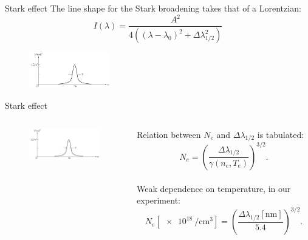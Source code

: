\documentclass[final]{beamer}
\begin{document}
  \begin{frame}{Stark effect}
    The line shape for the Stark broadening takes that of a Lorentzian:
    \begin{equation*}
      I\left( \lambda \right)=\frac{A^2}{4\left( \left(\lambda-\lambda_0\right)^2+\Delta \lambda_{1/2}^2\right)}
    \end{equation*}
    \begin{figure}
\includegraphics[width=100pt]{figures/lorentzian_lineshape.png}
    \end{figure}
\end{frame}
\begin{frame}{Stark effect}
  \begin{columns}
    \begin{figure}
      \includegraphics[width=100pt]{figures/lorentzian_lineshape.png}
    \end{figure}
    Relation between $N_e$ and $\Delta \lambda_{1/2}$ is tabulated: $$N_e=\left( \frac{\Delta\lambda_{1/2}}{\gamma\left(n_e,T_e\right)}\right)^{3/2}.$$
    \\
    Weak dependence on temperature, in our experiment: $$N_e\left[\SI{e18}{\per\cubic\cm}\right]=\left( \frac{\Delta\lambda_{1/2}\left[\si{\nm}\right]}{5.4}\right)^{3/2}.$$
  \end{columns}
  \end{frame}
\end{document}
